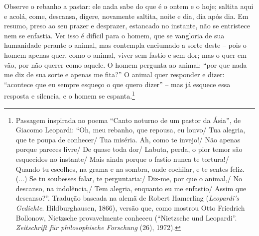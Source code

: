 Observe o rebanho a pastar: ele nada sabe do que é o ontem e o hoje;
saltita aqui e acolá, come, descansa, digere, novamente saltita, noite e
dia, dia após dia. Em resumo, preso ao seu prazer e desprazer, estancado
no instante, não se entristece nem se enfastia. Ver isso é difícil para
o homem, que se vangloria de sua humanidade perante o animal, mas
contempla enciumado a sorte deste -- pois o homem apenas quer, como o
animal, viver sem fastio e sem dor; mas o quer em vão, por não querer
como aquele. O homem pergunta ao animal: ``por que nada me diz de sua
sorte e apenas me fita?'' O animal quer responder e dizer: ``acontece que eu
sempre esqueço o que quero dizer'' -- mas já esquece essa resposta e
silencia, e o homem se espanta.\footnote{Passagem inspirada no poema
  ``Canto noturno de um pastor da Ásia'', de Giacomo Leopardi: ``Oh, meu
  rebanho, que repousa, eu louvo/ Tua alegria, que te poupa de
  conhecer/ Tua miséria. Ah, como te invejo!/ Não apenas porque pareces
  livre/ De quase toda dor/ Labuta, perda, o pior temor são esquecidos no
  instante/ Mais ainda porque o fastio nunca te tortura!/ Quando tu
  escolhes, na grama e na sombra, onde cochilar, e te sentes feliz.
  (...) Se tu soubesses falar, te perguntaria:/ Diz-me, por que o
  animal,/ No descanso, na indolência,/ Tem alegria, enquanto eu me
  enfastio/ Assim que descanso?''. Tradução baseada na alemã de
  Robert Hamerling (\emph{Leopardi's Gedichte}. Hildburghausen, 1866),
  versão que, como mostrou Otto Friedrich Bollonow, Nietzsche
  provavelmente conheceu (``Nietzsche und Leopardi''. \emph{Zeitschrift
  für philosophische Forschung} (26), 1972).}

